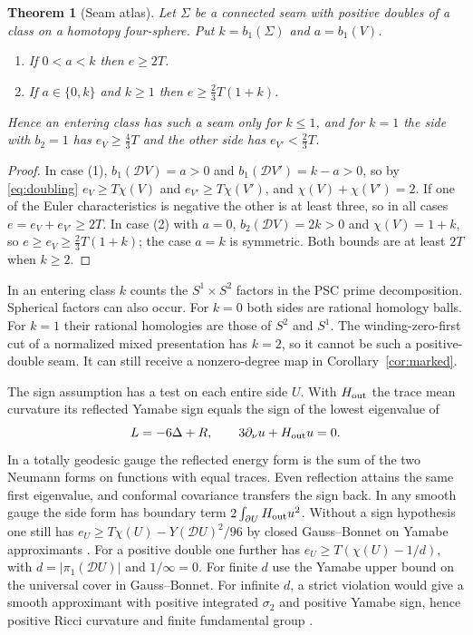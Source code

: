\documentclass[11pt,letterpaper]{article}
\numberwithin{equation}{section}
\newtheorem{theorem}{Theorem}[section]
\theoremstyle{definition}
\newcommand{\cD}{\mathcal D}
\begin{document}
\begin{theorem}[Seam atlas]\label{thm:atlas}
Let \(\Sigma\) be a connected seam with positive doubles of a
class on a homotopy four-sphere. Put \(k=b_1(\Sigma)\) and \(a=b_1(V)\).
\begin{enumerate}
\item If \(0<a<k\) then \(e\ge2T\).
\item If \(a\in\{0,k\}\) and \(k\ge1\) then \(e\ge\tfrac23T(1+k)\).
\end{enumerate}
Hence an entering class has such a seam only for \(k\le1\), and for
\(k=1\) the side with \(b_2=1\) has \(e_V\ge\tfrac43T\) and the other side
has \(e_{V'}<\tfrac23T\).
\end{theorem}
\begin{proof}
In case (1), \(b_1(\cD V)=a>0\) and \(b_1(\cD V')=k-a>0\), so by
\eqref{eq:doubling} \(e_V\ge T\chi(V)\) and \(e_{V'}\ge T\chi(V')\), and
\(\chi(V)+\chi(V')=2\). If one of the Euler characteristics is negative
the other is at least three, so in all cases \(e=e_V+e_{V'}\ge2T\). In
case (2) with \(a=0\), \(b_2(\cD V)=2k>0\) and \(\chi(V)=1+k\), so
\(e\ge e_V\ge\tfrac23T(1+k)\); the case \(a=k\) is symmetric. Both bounds
are at least \(2T\) when \(k\ge2\).
\end{proof}

In an entering class \(k\) counts the \(S^1\times S^2\) factors in
the PSC prime decomposition. Spherical factors can also occur. For
\(k=0\) both sides are rational homology balls. For \(k=1\) their
rational homologies are those of \(S^2\) and \(S^1\).
The winding-zero-first cut of a normalized mixed presentation has
\(k=2\), so it cannot be such a positive-double seam. It can still
receive a nonzero-degree map in Corollary~\ref{cor:marked}.

The sign assumption has a test on each entire side \(U\). With
\(H_{\rm out}\) the trace mean curvature its reflected Yamabe sign
equals the sign of the lowest eigenvalue of
\[
 L=-6\Delta+R,\qquad 3\partial_\nu u+H_{\rm out}u=0.
\]
In a totally geodesic gauge the reflected energy form is the sum of the
two Neumann forms on functions with equal traces. Even reflection attains
the same first eigenvalue, and conformal covariance transfers the sign
back. In any smooth gauge the side form has boundary term
\(2\int_{\partial U}H_{\rm out}u^2\). Without a sign hypothesis one
still has \(e_U\ge T\chi(U)-Y(\cD U)^2/96\) by closed Gauss--Bonnet on
Yamabe approximants \cite{Baker2026ChiralMaster}.
For a positive double one further has
\(e_U\ge T(\chi(U)-1/d)\), with \(d=|\pi_1(\cD U)|\) and \(1/\infty=0\).
For finite \(d\) use the Yamabe upper bound on the universal cover in
Gauss--Bonnet. For infinite \(d\), a strict violation would give a
smooth approximant with positive integrated \(\sigma_2\) and positive
Yamabe sign, hence positive Ricci curvature and finite fundamental group
\cite{ChangGurskyYang2002PositiveRicci,GurskyViaclovsky2003FullyNonlinear}.
\end{document}
